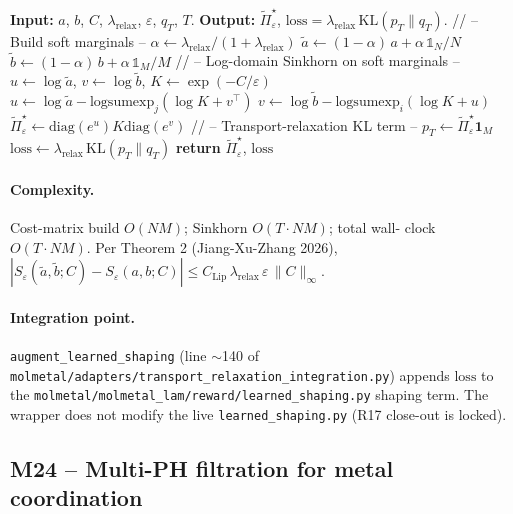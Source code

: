 \begin{algorithmic}[1]
  \STATE \textbf{Input:} $a$, $b$, $C$, $\lambda_{\mathrm{relax}}$,
         $\varepsilon$, $q_{T}$, $T$.
  \STATE \textbf{Output:} $\tilde{\Pi}^{\star}_{\varepsilon}$,
         $\mathrm{loss} = \lambda_{\mathrm{relax}}\, \mathrm{KL}(p_{T} \| q_{T})$.
  \STATE // -- Build soft marginals --
  \STATE $\alpha \gets \lambda_{\mathrm{relax}} / (1 + \lambda_{\mathrm{relax}})$
  \STATE $\tilde{a} \gets (1 - \alpha)\, a + \alpha\, \mathbb{1}_{N} / N$
  \STATE $\tilde{b} \gets (1 - \alpha)\, b + \alpha\, \mathbb{1}_{M} / M$
  \STATE // -- Log-domain Sinkhorn on soft marginals --
  \STATE $u \gets \log \tilde{a}$, $v \gets \log \tilde{b}$, $K \gets \exp(-C / \varepsilon)$
    \STATE $u \gets \log \tilde{a} - \mathrm{logsumexp}_{j}(\log K + v^{\top})$
    \STATE $v \gets \log \tilde{b} - \mathrm{logsumexp}_{i}(\log K + u)$
  \ENDFOR
  \STATE $\tilde{\Pi}^{\star}_{\varepsilon} \gets \mathrm{diag}(e^{u}) K \mathrm{diag}(e^{v})$
  \STATE // -- Transport-relaxation KL term --
  \STATE $p_{T} \gets \tilde{\Pi}^{\star}_{\varepsilon} \mathbf{1}_{M}$
  \STATE $\mathrm{loss} \gets \lambda_{\mathrm{relax}}\, \mathrm{KL}(p_{T} \| q_{T})$
  \STATE \textbf{return} $\tilde{\Pi}^{\star}_{\varepsilon}$, $\mathrm{loss}$
\end{algorithmic}

\paragraph{Complexity.}
Cost-matrix build $O(NM)$; Sinkhorn $O(T \cdot NM)$; total wall-
clock $O(T \cdot NM)$.  Per Theorem 2 (Jiang-Xu-Zhang 2026),
$|S_{\varepsilon}(\tilde{a}, \tilde{b}; C) - S_{\varepsilon}(a, b;
C)| \le C_{\mathrm{Lip}}\, \lambda_{\mathrm{relax}}\, \varepsilon
\, \|C\|_{\infty}$.

\paragraph{Integration point.}
\texttt{augment\_learned\_shaping} (line $\sim$140 of
\texttt{molmetal/adapters/transport\_relaxation\_integration.py})
appends $\mathrm{loss}$ to the
\texttt{molmetal/molmetal\_lam/reward/learned\_shaping.py} shaping
term.  The wrapper does not modify the live
\texttt{learned\_shaping.py} (R17 close-out is locked).

\subsection*{M24 -- Multi-PH filtration for metal coordination}
\label{supp:s2-m24}

